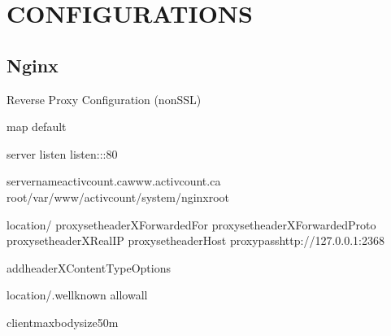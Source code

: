 \documentclass[letterpaper,10pt,english]{sphinxmanual}
\begin{document}
\chapter{CONFIGURATIONS}
\label{\detokenize{configurations:configurations}}\label{\detokenize{configurations::doc}}

\section{Nginx}
\label{\detokenize{configurations:nginx}}
\sphinxAtStartPar
Reverse Proxy Configuration (non\sphinxhyphen{}SSL)

\begin{sphinxVerbatim}[commandchars=\\\{\}]
map
default

server
listen
listen\PYG{o}{[}::\PYG{o}{]}:80

server\PYGZus{}nameactivcount.cawww.activcount.ca
root/var/www/activcount/system/nginx\PYGZhy{}root

location/
proxy\PYGZus{}set\PYGZus{}headerX\PYGZhy{}Forwarded\PYGZhy{}For
proxy\PYGZus{}set\PYGZus{}headerX\PYGZhy{}Forwarded\PYGZhy{}Proto
proxy\PYGZus{}set\PYGZus{}headerX\PYGZhy{}Real\PYGZhy{}IP
proxy\PYGZus{}set\PYGZus{}headerHost
proxy\PYGZus{}passhttp://127.0.0.1:2368

add\PYGZus{}headerX\PYGZhy{}Content\PYGZhy{}Type\PYGZhy{}Options

location\PYGZti{}/.well\PYGZhy{}known
allowall

client\PYGZus{}max\PYGZus{}body\PYGZus{}size50m
\end{sphinxVerbatim}
\end{document}

